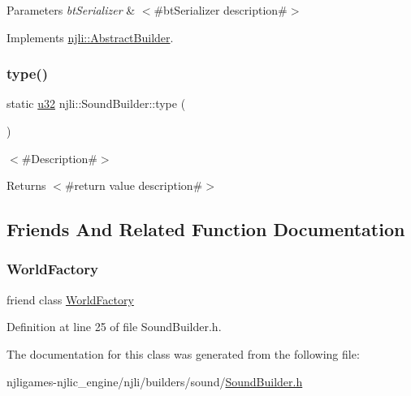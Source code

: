 \begin{DoxyParams}{Parameters}
{\em bt\+Serializer} & $<$\#bt\+Serializer description\#$>$ \\
\hline
\end{DoxyParams}


Implements \mbox{\hyperlink{classnjli_1_1_abstract_builder_ab66b774e02ccb9da554c9aab7fa6d981}{njli\+::\+Abstract\+Builder}}.

\mbox{\label{classnjli_1_1_sound_builder_ae0834b181129d3880db67232fa56580a}} 
\subsubsection{\texorpdfstring{type()}{type()}}
{\footnotesize\ttfamily static \mbox{\hyperlink{_util_8h_a10e94b422ef0c20dcdec20d31a1f5049}{u32}} njli\+::\+Sound\+Builder\+::type (\begin{DoxyParamCaption}{ }\end{DoxyParamCaption})\hspace{0.3cm}{\ttfamily [static]}}

$<$\#\+Description\#$>$

\begin{DoxyReturn}{Returns}
$<$\#return value description\#$>$ 
\end{DoxyReturn}


\subsection{Friends And Related Function Documentation}
\mbox{\label{classnjli_1_1_sound_builder_acb96ebb09abe8f2a37a915a842babfac}} 
\subsubsection{\texorpdfstring{World\+Factory}{WorldFactory}}
{\footnotesize\ttfamily friend class \mbox{\hyperlink{classnjli_1_1_world_factory}{World\+Factory}}\hspace{0.3cm}{\ttfamily [friend]}}



Definition at line 25 of file Sound\+Builder.\+h.



The documentation for this class was generated from the following file\+:\begin{DoxyCompactItemize}
\item 
njligames-\/njlic\+\_\+engine/njli/builders/sound/\mbox{\hyperlink{_sound_builder_8h}{Sound\+Builder.\+h}}\end{DoxyCompactItemize}
